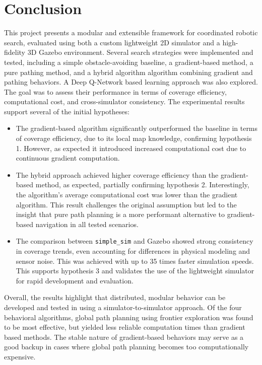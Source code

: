 \section{Conclusion}
\label{sec:Conclusion}
This project presents a modular and extensible framework for coordinated robotic search, evaluated using both a custom lightweight 2D simulator and a high-fidelity 3D Gazebo environment. Several search strategies were implemented and tested, including a simple obstacle-avoiding baseline, a gradient-based method, a pure pathing method, and a hybrid algorithm algorithm combining gradient and pathing behaviors. A Deep Q-Network based learning approach was also explored. The goal was to assess their performance in terms of coverage efficiency, computational cost, and cross-simulator consistency. The experimental results support several of the initial hypotheses:

\begin{itemize}
    \item The gradient-based algorithm significantly outperformed the baseline in terms of coverage efficiency, due to its local map knowledge, confirming hypothesis 1. However, as expected it introduced increased computational cost due to continuous gradient computation.

    \item The hybrid approach achieved higher coverage efficiency than the gradient-based method, as expected, partially confirming hypothesis 2. Interestingly, the algorithm's average computational cost was lower than the gradient algorithm. This result challenges the original assumption but led to the insight that pure path planning is a more performant alternative to gradient-based navigation in all tested scenarios.

    \item The comparison between \texttt{simple\_sim} and Gazebo showed strong consistency in coverage trends, even accounting for differences in physical modeling and sensor noise. This was achieved with up to 35 times faster simulation speeds. This supports hypothesis 3 and validates the use of the lightweight simulator for rapid development and evaluation.

\end{itemize}

Overall, the results highlight that distributed, modular behavior can be developed and tested in using a simulator-to-simulator approach. Of the four behavioral algorithms, global path planning using frontier exploration was found to be most effective, but yielded less reliable computation times than gradient based methods. The stable nature of gradient-based behaviors may serve as a good backup in cases where global path planning becomes too computationally expensive.
